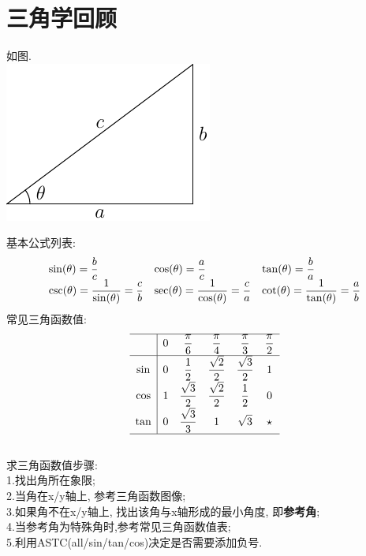 \chapter{三角学回顾}
如图.\\
\includegraphics{triangel.pdf}

基本公式列表:
\begin{equation*}
\begin{array}{l l l}
    \displaystyle\sin(\theta)=\frac{b}{c} & \displaystyle\cos(\theta)=\frac{a}{c} & \displaystyle\tan(\theta)=\frac{b}{a}\\
    \displaystyle\csc(\theta)=\frac{1}{\sin(\theta)}=\frac{c}{b} & \displaystyle\sec(\theta)=\frac{1}{\cos(\theta)}=\frac{c}{a} & \displaystyle\cot(\theta)=\frac{1}{\tan(\theta)}=\frac{a}{b}
\end{array}
\end{equation*}
常见三角函数值:\\
\begin{equation*}
\begin{array}{>{\displaystyle}c|>{\displaystyle}c >{\displaystyle}c >{\displaystyle}c >{\displaystyle}c >{\displaystyle}c}
\hline
    & 0 & \frac{\pi}{6} & \frac{\pi}{4} & \frac{\pi}{3} & \frac{\pi}{2}\\[1ex]
\hline
    \sin & 0 & \frac{1}{2} & \frac{\sqrt{2}}{2} & \frac{\sqrt{3}}{2} & 1\\[1ex]
    \cos & 1 & \frac{\sqrt{3}}{2} & \frac{\sqrt{2}}{2} & \frac{1}{2} & 0\\[1ex]
    \tan & 0 & \frac{\sqrt{3}}{3} & 1 & \sqrt{3} & \star\\[1ex]
\hline
\end{array}
\end{equation*}\\

求三角函数值步骤:\\
1.找出角所在象限;\\
2.当角在x/y轴上, 参考三角函数图像;\\
3.如果角不在x/y轴上, 找出该角与x轴形成的最小角度, 即\textbf{参考角};\\
4.当参考角为特殊角时,参考常见三角函数值表;\\
5.利用ASTC(all/sin/tan/cos)决定是否需要添加负号.

